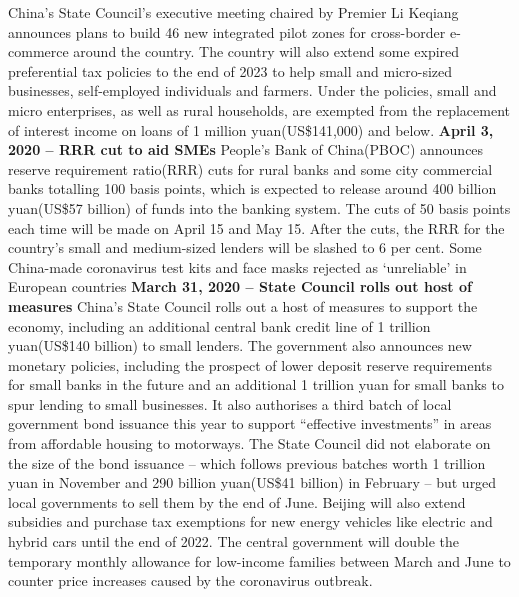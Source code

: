 \documentclass[11pt, a4paper]{article}
\begin{document}
            \bigbreak
            China’s State Council’s executive meeting chaired by Premier Li Keqiang announces plans to build 46 new integrated pilot zones for cross-border e-commerce around the country.
            \bigbreak
            The country will also extend some expired preferential tax policies to the end of 2023 to help small and micro-sized businesses, self-employed individuals and farmers. Under the policies, small and micro enterprises, as well as rural households, are exempted from the replacement of interest income on loans of 1 million yuan(US\$141,000) and below.
            \bigbreak
            \textbf{April 3, 2020 – RRR cut to aid SMEs}
            \bigbreak
            People’s Bank of China(PBOC) announces reserve requirement ratio(RRR) cuts for rural banks and some city commercial banks totalling 100 basis points, which is expected to release around 400 billion yuan(US\$57 billion) of funds into the banking system. The cuts of 50 basis points each time will be made on April 15 and May 15. After the cuts, the RRR for the country's small and medium-sized lenders will be slashed to 6 per cent.
            \bigbreak
            Some China-made coronavirus test kits and face masks rejected as ‘unreliable’ in European countries
            \bigbreak
            \noindent
            \textbf{March 31, 2020 – State Council rolls out host of measures}
            \bigbreak
            China’s State Council rolls out a host of measures to support the economy, including an additional central bank credit line of 1 trillion yuan(US\$140 billion) to small lenders. The government also announces new monetary policies, including the prospect of lower deposit reserve requirements for small banks in the future and an additional 1 trillion yuan for small banks to spur lending to small businesses.
            \bigbreak
            It also authorises a third batch of local government bond issuance this year to support “effective investments” in areas from affordable housing to motorways. The State Council did not elaborate on the size of the bond issuance – which follows previous batches worth 1 trillion yuan in November and 290 billion yuan(US\$41 billion) in February – but urged local governments to sell them by the end of June.
            \bigbreak
            Beijing will also extend subsidies and purchase tax exemptions for new energy vehicles like electric and hybrid cars until the end of 2022.
            \bigbreak
            The central government will double the temporary monthly allowance for low-income families between March and June to counter price increases caused by the coronavirus outbreak.
\end{document}
